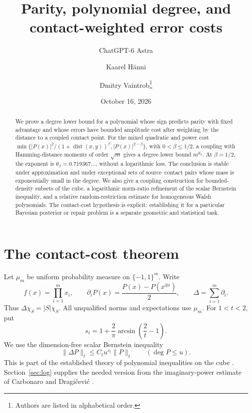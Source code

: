 \documentclass[11pt]{article}
\title{Parity, polynomial degree, and contact-weighted error costs}
\author{ChatGPT-6 Astra \and Kaarel H\"anni \and Dmitry Vaintrob\thanks{Authors are listed in alphabetical order.}}
\date{October 16, 2026}
\theoremstyle{remark}\newtheorem{remark}[theorem]{Remark}
\newcommand{\1}{\mathbf 1}\newcommand{\norm}[2]{\lVert #1\rVert_{#2}}
\newcommand{\dist}{\operatorname{dist}}\newcommand{\sgn}{\operatorname{sign}}
\begin{document}
\maketitle
\begin{abstract}
We prove a degree lower bound for a polynomial whose sign predicts parity with fixed advantage and whose errors have bounded amplitude cost after weighting by the distance to a coupled contact point. For the mixed quadratic and power cost $\min\{|P(x)|^2/(1+\dist(x,y))^\beta,|P(x)|^{2-\beta}\}$, with $0<\beta\le1/2$, a coupling with Hamming-distance moments of order $\sqrt m$ gives a degree lower bound $m^{\theta_\beta}$. At $\beta=1/2$, the exponent is $\theta_\beta=0.719367\ldots$, without a logarithmic loss. The conclusion is stable under approximation and under exceptional sets of source--contact pairs whose mass is exponentially small in the degree. We also give a coupling construction for bounded-density subsets of the cube, a logarithmic norm-ratio refinement of the scalar Bernstein inequality, and a relative random-restriction estimate for homogeneous Walsh polynomials. The contact-cost hypothesis is explicit: establishing it for a particular Bayesian posterior or repair problem is a separate geometric and statistical task.
\end{abstract}

\section{The contact-cost theorem}
Let $\mu_m$ be uniform probability measure on $\{-1,1\}^m$. Write
\[
 f(x)=\prod_{i=1}^m x_i,\qquad
 \partial_i P(x)=\frac{P(x)-P(x^{\oplus i})}{2},\qquad
 \Delta=\sum_{i=1}^m\partial_i.
\]
Thus $\Delta\chi_S=|S|\chi_S$. All unqualified norms and expectations use $\mu_m$. For $1<t<2$, put
\[
 s_t=1+\frac{2}{\pi}\arcsin\!\left(\frac2t-1\right).
\]
We use the dimension-free scalar Bernstein inequality
\begin{equation}\label{eq:bernstein}
 \norm{\Delta P}{t}\le C_t u^{s_t}\norm{P}{t}
 \qquad (\deg P\le u).
\end{equation}
This is part of the established theory of polynomial inequalities on the cube \cite{EI}. Section~\ref{sec:log} supplies the needed version from the imaginary-power estimate of Carbonaro and Dragi\v cevi\'c \cite{CD}.
\end{document}
